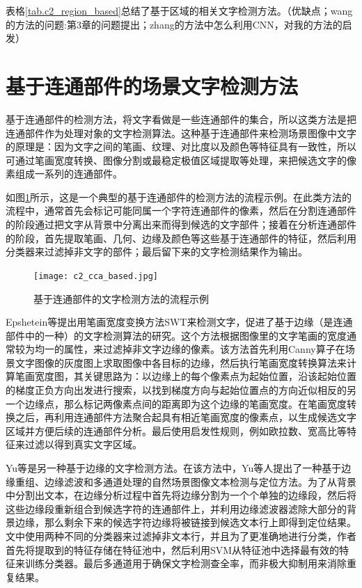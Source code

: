     表格\ref{tab.c2_region_based}总结了基于区域的相关文字检测方法。（优缺点；wang的方法的问题:第3章的问题提出；zhang的方法中怎么利用CNN，对我的方法的启发）

    \section{基于连通部件的场景文字检测方法}

    基于连通部件的检测方法，将文字看做是一些连通部件的集合，所以这类方法是把连通部件作为处理对象的文字检测算法。这种基于连通部件来检测场景图像中文字的原理是：因为文字之间的笔画、纹理、对比度以及颜色等特征具有一致性，所以可通过笔画宽度转换、图像分割或最稳定极值区域提取等处理，来把候选文字的像素组成一系列的连通部件。
    
    如图\ref{fig.c2_cca_based}所示，这是一个典型的基于连通部件的检测方法的流程示例。在此类方法的流程中，通常首先会标记可能同属一个字符连通部件的像素，然后在分割连通部件的阶段通过把文字从背景中分离出来而得到候选的文字部件；接着在分析连通部件的阶段，首先提取笔画、几何、边缘及颜色等这些基于连通部件的特征，然后利用分类器来过滤掉非文字的部件；最后留下来的文字检测结果作为输出。

    \begin{figure}[!h]
    \centering
    \texttt{[image: c2\_cca\_based.jpg]}
    \caption{基于连通部件的文字检测方法的流程示例}
    \label{fig.c2_cca_based}
    \end{figure}
    
    Epshetein等\cite{Epshtein2010Detecting}提出用笔画宽度变换方法SWT来检测文字，促进了基于边缘（是连通部件中的一种）的文字检测算法的研究。这个方法根据图像里的文字笔画的宽度通常较为均一的属性，来过滤掉非文字边缘的像素。该方法首先利用Canny算子在场景文字图像的灰度图上求取图像中各目标的边缘，然后执行笔画宽度转换算法来计算笔画宽度图，其关键思路为：以边缘上的每个像素点为起始位置，沿该起始位置的梯度正负方向出发进行搜索，以找到梯度方向与起始位置点的方向近似相反的另一个边缘点，那么标记两像素点间的距离即为这个边缘的笔画宽度。在笔画宽度转换之后，再利用连通部件方法聚合起具有相近笔画宽度的像素点，以生成候选文字区域并方便后续的连通部件分析。最后使用启发性规则，例如欧拉数、宽高比等特征来过滤以得到真实文字区域。
    
    Yu等\cite{Yu2016Scene}是另一种基于边缘的文字检测方法。在该方法中，Yu等人提出了一种基于边缘重组、边缘滤波和多通道处理的自然场景图像文本检测与定位方法。为了从背景中分割出文本，在边缘分析过程中首先将边缘分割为一个个单独的边缘段，然后将这些边缘段重新组合到候选字符的连通部件上，并利用边缘滤波器滤除大部分的背景边缘，那么剩余下来的候选字符边缘将被链接到候选文本行上即得到定位结果。文中使用两种不同的分类器来过滤掉非文本行，并且为了更准确地进行分类，作者首先将提取到的特征存储在特征池中，然后利用SVM从特征池中选择最有效的特征来训练分类器。最后多通道用于确保文字检测查全率，而非极大抑制用来消除重复结果。
    
